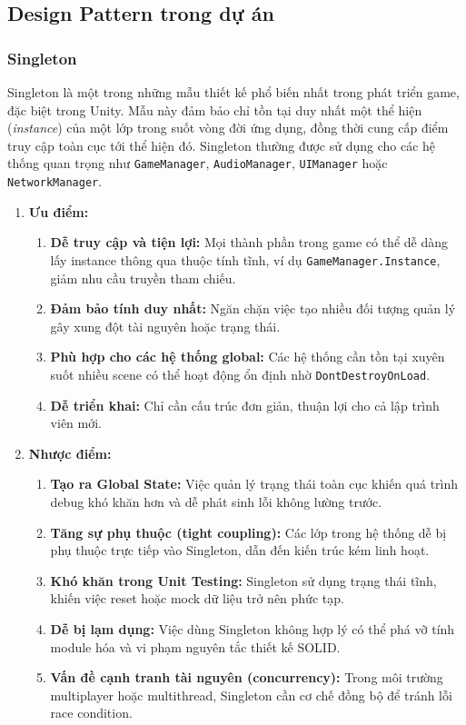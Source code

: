 \subsection{Design Pattern trong dự án}
\subsubsection{Singleton}

Singleton là một trong những mẫu thiết kế phổ biến nhất trong phát triển game, đặc biệt trong Unity. Mẫu này đảm bảo chỉ tồn tại duy nhất một thể hiện (\textit{instance}) của một lớp trong suốt vòng đời ứng dụng, đồng thời cung cấp điểm truy cập toàn cục tới thể hiện đó. Singleton thường được sử dụng cho các hệ thống quan trọng như \texttt{GameManager}, \texttt{AudioManager}, \texttt{UIManager} hoặc \texttt{NetworkManager}.

\begin{enumerate}[$\bullet$]
    \item{\textbf{Ưu điểm:}}
    \begin{enumerate}[+]
    \item \textbf{Dễ truy cập và tiện lợi:} Mọi thành phần trong game có thể dễ dàng lấy instance thông qua thuộc tính tĩnh, ví dụ \texttt{GameManager.Instance}, giảm nhu cầu truyền tham chiếu.
    \item \textbf{Đảm bảo tính duy nhất:} Ngăn chặn việc tạo nhiều đối tượng quản lý gây xung đột tài nguyên hoặc trạng thái.
    \item \textbf{Phù hợp cho các hệ thống global:} Các hệ thống cần tồn tại xuyên suốt nhiều scene có thể hoạt động ổn định nhờ \texttt{DontDestroyOnLoad}.
    \item \textbf{Dễ triển khai:} Chỉ cần cấu trúc đơn giản, thuận lợi cho cả lập trình viên mới.
\end{enumerate}
\newpage
\item{\textbf{Nhược điểm:}}
\begin{enumerate}[+]
    \item \textbf{Tạo ra Global State:} Việc quản lý trạng thái toàn cục khiến quá trình debug khó khăn hơn và dễ phát sinh lỗi không lường trước.
    \item \textbf{Tăng sự phụ thuộc (tight coupling):} Các lớp trong hệ thống dễ bị phụ thuộc trực tiếp vào Singleton, dẫn đến kiến trúc kém linh hoạt.
    \item \textbf{Khó khăn trong Unit Testing:} Singleton sử dụng trạng thái tĩnh, khiến việc reset hoặc mock dữ liệu trở nên phức tạp.
    \item \textbf{Dễ bị lạm dụng:} Việc dùng Singleton không hợp lý có thể phá vỡ tính module hóa và vi phạm nguyên tắc thiết kế SOLID.
    \item \textbf{Vấn đề cạnh tranh tài nguyên (concurrency):} Trong môi trường multiplayer hoặc multithread, Singleton cần cơ chế đồng bộ để tránh lỗi race condition.
\end{enumerate}
\end{enumerate}


